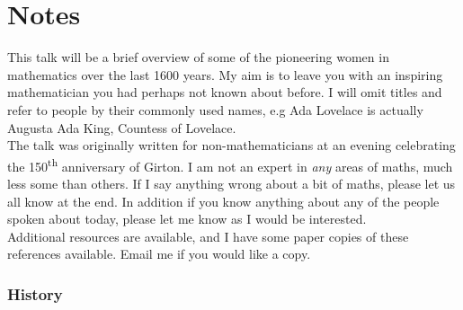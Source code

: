 \documentclass{article}
\begin{document}
\section*{Notes}

This talk will be a brief overview of some of the pioneering women in mathematics over the last 1600 years. My aim is to leave you with an inspiring mathematician you had perhaps not known about before. I will omit titles and refer to people by their commonly used names, e.g Ada Lovelace is actually Augusta Ada King, Countess of Lovelace.\\
The talk was originally written for non-mathematicians at an evening celebrating the 150\textsuperscript{th} anniversary of Girton. I am not an expert in \emph{any} areas of maths, much less some than others. If I say anything wrong about a bit of maths, please let us all know at the end. In addition if you know anything about any of the people spoken about today, please let me know as I would be interested. \\
Additional resources are available, and I have some paper copies of these references available. Email me if you would like a copy.

\subsubsection*{History}
\end{document}
